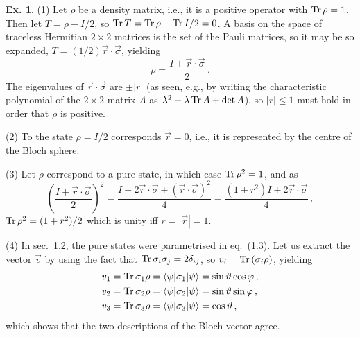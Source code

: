 \documentclass[a4paper,12pt]{article}
\def\Tr{\ensuremath{\mathop{\rm Tr}}{}}
\theoremstyle{definition}
\newtheorem{exercise}{Ex.}[section]
\begin{document}
\begin{exercise}
 (1) Let $\rho$ be a density matrix, i.e., it is a positive operator with $\Tr \rho =1$. Then let $T = \rho -I/2$, so $\Tr T = \Tr \rho - \Tr I/2 =0$. A basis on the space of traceless Hermitian $2\times 2$ matrices is the set of the Pauli matrices, so it may be so expanded, $T = (1/2) \vec{r}\cdot\vec{\sigma}$, yielding
 \[
  \rho = \frac{I + \vec{r}\cdot\vec{\sigma}}{2}\,.
 \]
 The eigenvalues of $\vec{r}\cdot\vec{\sigma}$ are $\pm |r|$ (as seen, e.g., by writing the characteristic polynomial of the $2\times 2$ matrix $A$ as $\lambda^2 - \lambda \Tr A + \det A$), so $|r|\le 1$ must hold in order that $\rho$ is positive.
 
 (2) To the state $\rho = I/2$ corresponds $\vec{r}=0$, i.e., it is represented by the centre of the Bloch sphere.
 
 (3) Let $\rho$ correspond to a pure state, in which case $\Tr\rho^2 = 1$, and as
 \[
  \left(\frac{I+\vec{r}\cdot\vec{\sigma}}{2}\right)^2 = \frac{I+2 \vec{r}\cdot\vec{\sigma}+(\vec{r}\cdot\vec{\sigma})^2}{4} = \frac{(1+r^2)I+2\vec{r}\cdot\vec{\sigma}}{4}\,,
 \]
 $\Tr \rho^2 = (1+r^2)/2$ which is unity iff $r=|\vec{r}|=1$.
 
 (4) In sec.\ 1.2, the pure states were parametrised in eq.\ (1.3). Let us extract the vector $\vec{v}$ by using the fact that $\Tr\sigma_i \sigma_j = 2\delta_{ij}$, so
 $v_i = \Tr(\sigma_i \rho)$, yielding
 \[
  \begin{aligned}
   v_1 &= \Tr \sigma_1 \rho = \langle \psi | \sigma_1 | \psi\rangle = \sin\vartheta\cos\varphi\,,\\
   v_2 &= \Tr \sigma_2 \rho = \langle \psi | \sigma_2 | \psi\rangle = \sin\vartheta\sin\varphi\,,\\
   v_3 &= \Tr \sigma_3 \rho = \langle \psi | \sigma_3 | \psi\rangle = \cos\vartheta\,,\\
  \end{aligned}
 \]
 which shows that the two descriptions of the Bloch vector agree.
\end{exercise}
\end{document}
